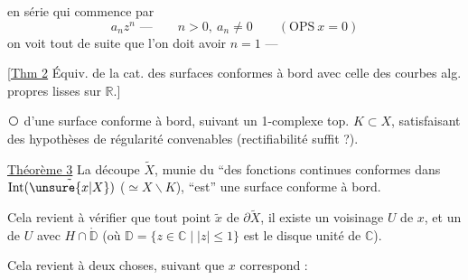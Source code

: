 
en série qui commence par
\[
a_n z^n\text{ ---}\qquad n>0,\ a_n\ne0\qquad(\mathrm{OPS}\ x=0)
\]
on voit tout de suite que l'on doit avoir $n=1$ ---


[\uline{Thm 2} Équiv. de la cat. des surfaces conformes à bord  avec celle des courbes alg. propres lisses sur $\mathbb R$.]


\textcircled{}  d'une surface conforme à bord, suivant un 1-complexe top. $K\subset X$, satisfaisant des hypothèses de régularité convenables (rectifiabilité suffit ?).

\uline{Théorème 3} La découpe $\widetilde X$, munie du    ``des fonctions  continues conformes dans $\operatorname{Int}(\tilde{\unsure{x|X}})$ ($\simeq X\smallsetminus K$), ``est'' une surface conforme à bord.


Cela revient à vérifier  que  tout point $\tilde x$ de $\partial\widetilde X$, il existe un voisinage  $U$ de $x$, et un   de $U$ avec $H\cap\mathring{\mathbb D}$ (où $\mathbb D=\{z\in\mathbb C\mid |z|\leq 1\}$ est le disque unité de $\mathbb C$).



Cela revient à deux choses, suivant que $x$ correspond :
